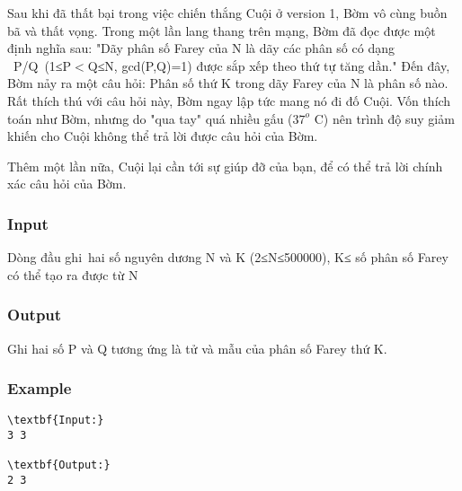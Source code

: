 



   Sau khi đã thất bại trong việc chiến thắng Cuội ở version 1, Bờm vô cùng buồn bã và thất vọng. Trong một lần lang thang trên mạng, Bờm đã đọc được một định nghĩa sau: "Dãy phân số Farey của N là dãy các phân số có dạng  P/Q (1≤P$<$Q≤N, gcd(P,Q)=1) được sắp xếp theo thứ tự tăng dần." Đến đây, Bờm nảy ra một câu hỏi: Phân số thứ K trong dãy Farey của N là phân số nào.  Rất thích thú với câu hỏi này, Bờm ngay lập tức mang nó đi đố Cuội. Vốn thích toán như Bờm, nhưng do "qua tay" quá nhiều gấu ($37^{o}$   C) nên trình độ suy giảm khiến cho Cuội không thể trả lời được câu hỏi của Bờm.  

   Thêm một lần nữa, Cuội lại cần tới sự giúp đỡ của bạn, để có thể trả lời chính xác câu hỏi của Bờm.  

\subsubsection{   Input  }

   Dòng đầu ghi hai số nguyên dương N và K (2≤N≤500000), K≤ số phân số Farey có thể tạo ra được từ N  

\subsubsection{   Output  }

   Ghi hai số P và Q tương ứng là tử và mẫu của phân số Farey thứ K.  

\subsubsection{   Example  }
\begin{verbatim}
\textbf{Input:}
3 3

\textbf{Output:}
2 3\end{verbatim}
